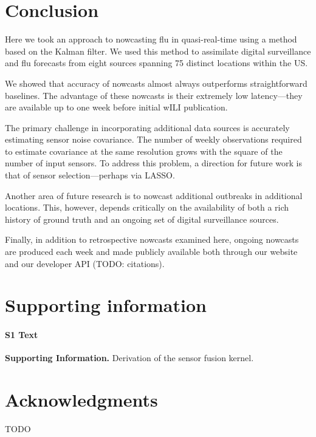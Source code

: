 \documentclass[10pt,letterpaper]{article}
\begin{document}
\section*{Conclusion}

Here we took an approach to nowcasting flu in quasi-real-time using a method
based on the Kalman filter. We used this method to assimilate digital
surveillance and flu forecasts from eight sources spanning 75 distinct
locations within the US.

We showed that accuracy of nowcasts almost always outperforms straightforward
baselines. The advantage of these nowcasts is their extremely low
latency---they are available up to one week before initial wILI publication.

The primary challenge in incorporating additional data sources is accurately
estimating sensor noise covariance. The number of weekly observations required
to estimate covariance at the same resolution grows with the square of the
number of input sensors. To address this problem, a direction for future work
is that of sensor selection---perhaps via LASSO.

Another area of future research is to nowcast additional outbreaks in
additional locations. This, however, depends critically on the availability of
both a rich history of ground truth and an ongoing set of digital surveillance
sources.

Finally, in addition to retrospective nowcasts examined here, ongoing nowcasts
are produced each week and made publicly available both through our website and
our developer API (TODO: citations).

\section*{Supporting information}

\paragraph*{S1 Text}
\label{S1_Text}
{\bf Supporting Information.} Derivation of the sensor fusion kernel.

\section*{Acknowledgments}

TODO

\nolinenumbers

\end{document}
